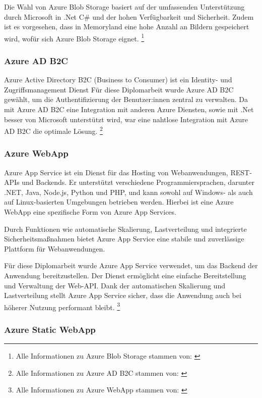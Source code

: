 Die Wahl von Azure Blob Storage basiert auf der umfassenden Unterstützung durch Microsoft 
in .Net C\# und der hohen Verfügbarkeit und Sicherheit. Zudem ist es vorgesehen, dass in Memoryland
eine hohe Anzahl an Bildern gespeichert wird, wofür sich Azure Blob Storage eignet.
\footnote{Alle Informationen zu Azure Blob Storage stammen von: \cite{MicrosoftCorporationu}}

\subsubsection{Azure AD B2C}
\label{subsection:azure_ad_b2c}

Azure Active Directory B2C (Business to Consumer) ist ein Identity- und Zugriffsmanagement Dienst
Für diese Diplomarbeit wurde Azure AD B2C gewählt, um die Authentifizierung der Benutzer:innen
zentral zu verwalten. Da mit Azure AD B2C eine Integration mit anderen Azure Diensten, sowie mit
.Net besser von Microsoft unterstützt wird, war eine nahtlose Integration mit Azure AD B2C 
die optimale Lösung.
\footnote{Alle Informationen zu Azure AD B2C stammen von: \cite{MicrosoftCorporationw} \cite{MicrosoftCorporationx}}

\subsubsection{Azure WebApp}
\label{subsection:azure_web_app}

Azure App Service ist ein Dienst für das Hosting von Webanwendungen, REST-APIs und 
Backends. Er unterstützt verschiedene Programmiersprachen, darunter .NET, Java, 
Node.js, Python und PHP, und kann sowohl auf Windows- als auch auf Linux-basierten 
Umgebungen betrieben werden. Hierbei ist eine Azure WebApp eine spezifische Form
von Azure App Services.

Durch Funktionen wie automatische Skalierung, Lastverteilung und integrierte 
Sicherheitsmaßnahmen bietet Azure App Service eine stabile und zuverlässige 
Plattform für Webanwendungen.

Für diese Diplomarbeit wurde Azure App Service verwendet, um das Backend der 
Anwendung bereitzustellen. Der Dienst ermöglicht eine einfache Bereitstellung 
und Verwaltung der Web-API. Dank der automatischen Skalierung und Lastverteilung 
stellt Azure App Service sicher, dass die Anwendung auch bei höherer Nutzung 
performant bleibt.
\footnote{Alle Informationen zu Azure WebApp stammen von: \cite{MicrosoftCorporationy}}

\subsubsection{Azure Static WebApp}
\label{subsection:azure_static_web_app}

